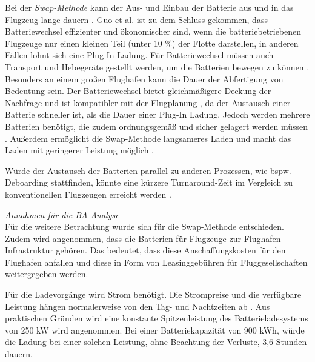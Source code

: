 Bei der \textit{Swap-Methode} kann der Aus- und Einbau der Batterie aus 
und in das Flugzeug lange dauern \cite{dalmia2022powering}. 
Guo et al. \cite{guo2020aviation} ist zu dem Schluss gekommen, 
dass Batteriewechsel effizienter und ökonomischer sind, 
wenn die batteriebetriebenen Flugzeuge nur einen kleinen Teil (unter 10 \%) der Flotte darstellen, 
in anderen Fällen lohnt sich eine Plug-In-Ladung. 
Für Batteriewechsel müssen auch Transport und Hebegeräte gestellt werden, 
um die Batterien bewegen zu können \cite{reimers2018introduction}.
Besonders an einem großen Flughafen kann die Dauer der Abfertigung von Bedeutung sein.
Der Batteriewechsel bietet gleichmäßigere Deckung der Nachfrage \cite{guo2020aviation} 
und ist kompatibler mit der Flugplanung \cite{salucci2020optimal}, 
da der Austausch einer Batterie schneller ist, als die Dauer einer Plug-In Ladung. 
Jedoch werden mehrere Batterien benötigt, 
die zudem ordnungsgemäß und sicher gelagert werden müssen \cite{salucci2020optimal}.
Außerdem ermöglicht die Swap-Methode langsameres Laden und macht 
das Laden mit geringerer Leistung möglich \cite{avogadro2024demystifying}.

Würde der Austausch der Batterien parallel zu anderen Prozessen, 
wie bspw. Deboarding stattfinden, könnte eine kürzere Turnaround-Zeit im 
Vergleich zu konventionellen Flugzeugen erreicht werden \cite{schmidt2016challenges}.

\textit{Annahmen für die BA-Analyse}\\
%
Für die weitere Betrachtung wurde sich für die Swap-Methode entschieden. 
Zudem wird angenommen, dass die Batterien für Flugzeuge zur Flughafen-Infrastruktur gehören.
Das bedeutet, dass diese Anschaffungskosten für den Flughafen anfallen 
und diese in Form von Leasinggebühren für Fluggesellschaften weitergegeben werden.

Für die Ladevorgänge wird Strom benötigt. 
Die Strompreise und die verfügbare Leistung hängen normalerweise 
von den Tag- und Nachtzeiten ab \cite{salucci2020optimal}. 
Aus praktischen Gründen wird eine konstante Spitzenleistung des Batterieladesystems von 250 kW wird angenommen. 
Bei einer Batteriekapazität von 900 kWh, würde die Ladung bei einer solchen Leistung, 
ohne Beachtung der Verluste, 3,6 Stunden dauern.

